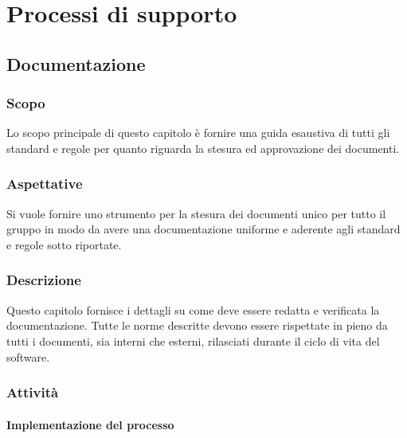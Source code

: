 \section{Processi di supporto}

	\subsection{Documentazione}

		\subsubsection{Scopo}
			Lo scopo principale di questo capitolo è fornire una guida esaustiva di tutti gli standard e regole per quanto riguarda la stesura ed approvazione dei documenti.
		\subsubsection{Aspettative}
			Si vuole fornire uno strumento per la stesura dei documenti unico per tutto il gruppo in modo da avere una documentazione uniforme e aderente agli standard e regole sotto riportate.
		\subsubsection{Descrizione}
			Questo capitolo fornisce i dettagli su come deve essere redatta e verificata la documentazione. Tutte le norme descritte devono essere rispettate in pieno da tutti i documenti, sia interni che esterni, rilasciati durante il ciclo di vita del software.
		\subsubsection{Attività}
			\paragraph{Implementazione del processo}

